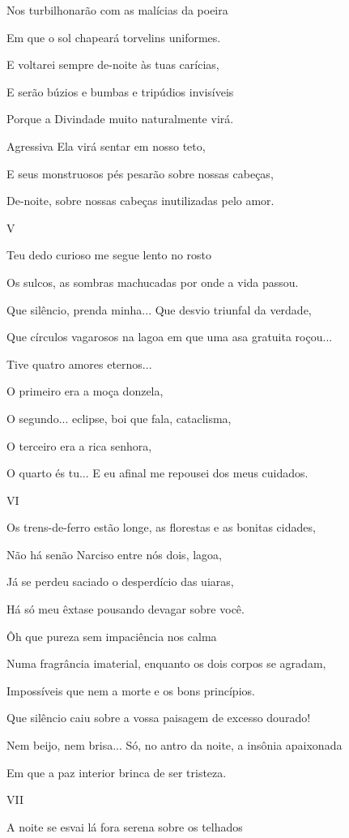 Nos turbilhonarão com as malícias da poeira

Em que o sol chapeará torvelins uniformes.

E voltarei sempre de-noite às tuas carícias,

E serão búzios e bumbas e tripúdios invisíveis

Porque a Divindade muito naturalmente virá.

Agressiva Ela virá sentar em nosso teto,

E seus monstruosos pés pesarão sobre nossas cabeças,

De-noite, sobre nossas cabeças inutilizadas pelo amor.

V

Teu dedo curioso me segue lento no rosto

Os sulcos, as sombras machucadas por onde a vida passou.

Que silêncio, prenda minha... Que desvio triunfal da verdade,

Que círculos vagarosos na lagoa em que uma asa gratuita roçou...

Tive quatro amores eternos...

O primeiro era a moça donzela,

O segundo... eclipse, boi que fala, cataclisma,

O terceiro era a rica senhora,

O quarto és tu... E eu afinal me repousei dos meus cuidados.

VI

Os trens-de-ferro estão longe, as florestas e as bonitas cidades,

Não há senão Narciso entre nós dois, lagoa,

Já se perdeu saciado o desperdício das uiaras,

Há só meu êxtase pousando devagar sobre você.

Ôh que pureza sem impaciência nos calma

Numa fragrância imaterial, enquanto os dois corpos se agradam,

Impossíveis que nem a morte e os bons princípios.

Que silêncio caiu sobre a vossa paisagem de excesso dourado!

Nem beijo, nem brisa... Só, no antro da noite, a insônia apaixonada

Em que a paz interior brinca de ser tristeza.

VII

A noite se esvai lá fora serena sobre os telhados

